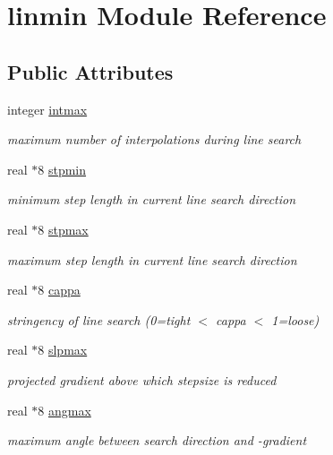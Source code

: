 \hypertarget{classlinmin}{\section{linmin Module Reference}
\label{classlinmin}
}
\subsection*{Public Attributes}
\begin{DoxyCompactItemize}
\item 
integer \hyperlink{classlinmin_a2acad4a46724281eebc133a23ba83ac0}{intmax}
\begin{DoxyCompactList}\small\item\em maximum number of interpolations during line search \end{DoxyCompactList}\item 
real $\ast$8 \hyperlink{classlinmin_af604d0ec9d1f8fa40766c12d95b311dd}{stpmin}
\begin{DoxyCompactList}\small\item\em minimum step length in current line search direction \end{DoxyCompactList}\item 
real $\ast$8 \hyperlink{classlinmin_a3d008c29592b9129fdae235012cf9b9c}{stpmax}
\begin{DoxyCompactList}\small\item\em maximum step length in current line search direction \end{DoxyCompactList}\item 
real $\ast$8 \hyperlink{classlinmin_a770737c749f078ddf7db6f68058c01d3}{cappa}
\begin{DoxyCompactList}\small\item\em stringency of line search (0=tight $<$ cappa $<$ 1=loose) \end{DoxyCompactList}\item 
real $\ast$8 \hyperlink{classlinmin_af2ae0469bbfd98f76cbb8aaa36b1f10b}{slpmax}
\begin{DoxyCompactList}\small\item\em projected gradient above which stepsize is reduced \end{DoxyCompactList}\item 
real $\ast$8 \hyperlink{classlinmin_ad8ca531ffe4ac8f1c9356ab531b613f8}{angmax}
\begin{DoxyCompactList}\small\item\em maximum angle between search direction and -\/gradient \end{DoxyCompactList}\end{DoxyCompactItemize}


